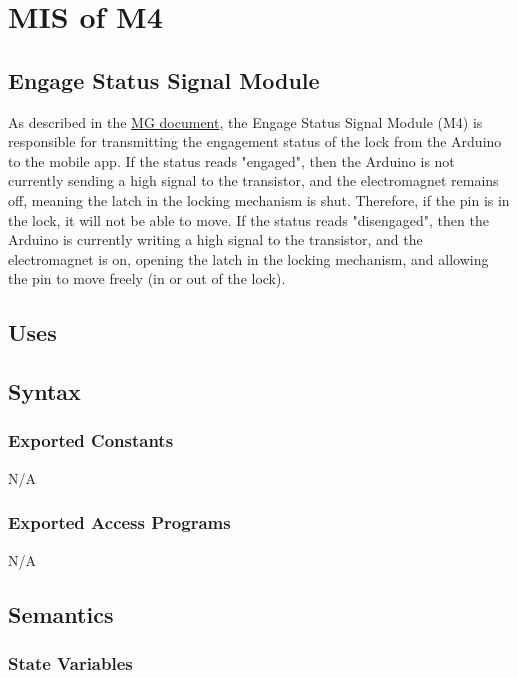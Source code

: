 \documentclass[12pt, titlepage]{article}
\begin{document}
\section{MIS of M4} \label{EngageStatus} 

\subsection{Engage Status Signal Module}

As described in the \href{https://github.com/NevoAbigail/Capstone/blob/main/docs/Design/SoftArchitecture/MG.pdf}{MG document}, the Engage Status Signal Module (M4) is responsible for transmitting the engagement status of the lock from the Arduino to the mobile app. If the status reads "engaged", then the Arduino is not currently sending a high signal to the transistor, and the electromagnet remains off, meaning the latch in the locking mechanism is shut. Therefore, if the pin is in the lock, it will not be able to move. If the status reads "disengaged", then the Arduino is currently writing a high signal to the transistor, and the electromagnet is on, opening the latch in the locking mechanism, and allowing the pin to move freely (in or out of the lock). 

\subsection{Uses}


\subsection{Syntax}

\subsubsection{Exported Constants}

N/A

\subsubsection{Exported Access Programs}

N/A

\subsection{Semantics}

\subsubsection{State Variables}
\end{document}
